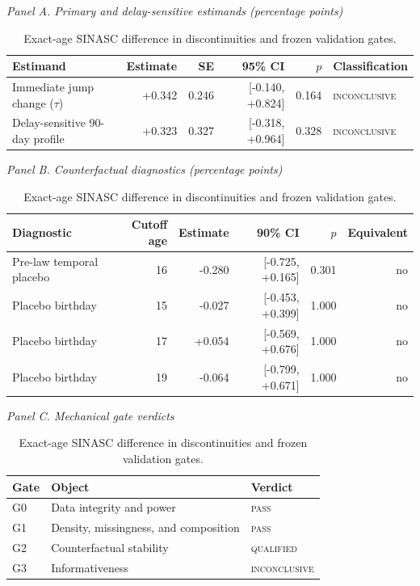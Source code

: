 \begin{table}[!htbp]
\centering
\caption{Exact-age SINASC difference in discontinuities and frozen validation gates.}
\label{tab:sinasc_daily}
\begingroup\scriptsize
\textit{Panel A. Primary and delay-sensitive estimands (percentage points)}\par\smallskip
\begin{tabular}{@{}lrrrrl@{}}
\toprule
Estimand & Estimate & SE & 95\% CI & $p$ & Classification \\
\midrule
Immediate jump change ($\tau$) & +0.342 & 0.246 & [-0.140, +0.824] & 0.164 & \textsc{inconclusive} \\
Delay-sensitive 90-day profile & +0.323 & 0.327 & [-0.318, +0.964] & 0.328 & \textsc{inconclusive} \\
\bottomrule
\end{tabular}
\par\medskip
\textit{Panel B. Counterfactual diagnostics (percentage points)}\par\smallskip
\begin{tabular}{@{}lrrrrr@{}}
\toprule
Diagnostic & Cutoff age & Estimate & 90\% CI & $p$ & Equivalent \\
\midrule
Pre-law temporal placebo & 16 & -0.280 & [-0.725, +0.165] & 0.301 & no \\
Placebo birthday & 15 & -0.027 & [-0.453, +0.399] & 1.000 & no \\
Placebo birthday & 17 & +0.054 & [-0.569, +0.676] & 1.000 & no \\
Placebo birthday & 19 & -0.064 & [-0.799, +0.671] & 1.000 & no \\
\bottomrule
\end{tabular}
\par\medskip
\textit{Panel C. Mechanical gate verdicts}\par\smallskip
\begin{tabular}{@{}lll@{}}
\toprule
Gate & Object & Verdict \\
\midrule
G0 & Data integrity and power & \textsc{pass} \\
G1 & Density, missingness, and composition & \textsc{pass} \\
G2 & Counterfactual stability & \textsc{qualified} \\
G3 & Informativeness & \textsc{inconclusive} \\
\bottomrule
\end{tabular}
\par\smallskip
\begin{minipage}{0.98\linewidth}\footnotesize

\end{minipage}
\end{table}
